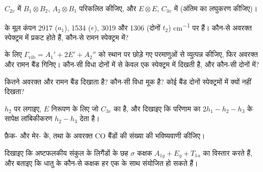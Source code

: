 \begin{exercise}[$\star$]\label{exo:b3:group-theory-applied:3}
$C_{2v}$ में  $B_1\otimes B_2$, $A_2\otimes B_1$ परिकलित कीजिए, और
$E\otimes E$, $C_{3v}$ में (अंतिम का लघुकरण कीजिए)।
\end{exercise}

\begin{exercise}[$\star$]\label{exo:b3:group-theory-applied:4}
 के मूल कंपन 2917 ($a_1$), 1534 ($e$), 3019 और 1306 (दोनों $t_2$)
\unit{cm^{-1}} पर हैं। कौन-से अवरक्त स्पेक्ट्रम में प्रकट होते हैं, कौन-से रामन
स्पेक्ट्रम में?
\end{exercise}

\begin{exercise}[$\star\star$]\label{exo:b3:group-theory-applied:5}
 के लिए $\Gamma_{\mathrm{vib}} = A_1' + 2E' + A_2''$ को स्थान पर छोड़े गए परमाणुओं से
व्युत्पन्न कीजिए, फिर अवरक्त और रामन बैंड गिनिए। कौन-सी विधा दोनों में से केवल एक
स्पेक्ट्रम में दिखती है, और कौन-सी दोनों में?
\end{exercise}

\begin{exercise}[$\star\star$]\label{exo:b3:group-theory-applied:6}
 कितने अवरक्त और रामन बैंड दिखाता है? कौन-सी विधा मूक है? कोई
बैंड दोनों स्पेक्ट्रमों में क्यों नहीं दिखता?
\end{exercise}

\begin{exercise}[$\star\star$]\label{exo:b3:group-theory-applied:7}
$h_2$ पर  लगाइए, $E$ निरूपण के लिए जो $C_{3v}$ का है, और
दिखाइए कि परिणाम का $2h_1 - h_2 - h_3$ के सापेक्ष लांबिकीकरण $h_2 - h_3$ देता है।
\end{exercise}

\begin{exercise}[$\star\star$]\label{exo:b3:group-theory-applied:8}
फ़ैक- और मेर- के, तथा
 के अवरक्त CO बैंडों की संख्या की भविष्यवाणी कीजिए।
\end{exercise}

\begin{exercise}[$\star\star$]\label{exo:b3:group-theory-applied:9}
दिखाइए कि अष्टफलकीय संकुल के लिगैंडों के छह $\sigma$ कक्षक
$A_{1g} + E_g + T_{1u}$ का विस्तार करते हैं, और बताइए कि धातु के कौन-से कक्षक हर एक के साथ संयोजित हो सकते हैं।
\end{exercise}

